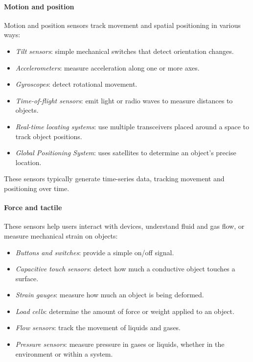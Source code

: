 \paragraph*{Motion and position}
Motion and position sensors track movement and spatial positioning in various ways:
\begin{itemize}
    \item \textit{Tilt sensors}: simple mechanical switches that detect orientation changes.
    \item \textit{Accelerometers}: measure acceleration along one or more axes.
    \item \textit{Gyroscopes}: detect rotational movement.
    \item \textit{Time-of-flight sensors}: emit light or radio waves to measure distances to objects.
    \item \textit{Real-time locating systems}: use multiple transceivers placed around a space to track object positions.
    \item \textit{Global Positioning System}: uses satellites to determine an object's precise location.
\end{itemize}
\noindent  These sensors typically generate time-series data, tracking movement and positioning over time.

\paragraph*{Force and tactile}
These sensors help users interact with devices, understand fluid and gas flow, or measure mechanical strain on objects:
\begin{itemize}
    \item \textit{Buttons and switches}: provide a simple on/off signal.
    \item \textit{Capacitive touch sensors}: detect how much a conductive object touches a surface.
    \item \textit{Strain gauges}: measure how much an object is being deformed.
    \item \textit{Load cells}: determine the amount of force or weight applied to an object.
    \item \textit{Flow sensors}: track the movement of liquids and gases.
    \item \textit{Pressure sensors}: measure pressure in gases or liquids, whether in the environment or within a system.
\end{itemize}

